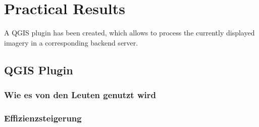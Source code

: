 
\chapter{Practical Results}
A QGIS plugin has been created, which allows to process the currently displayed imagery in a corresponding backend server.
		\section{QGIS Plugin}
		\subsection{Wie es von den Leuten genutzt wird}
		\subsection{Effizienzsteigerung}

